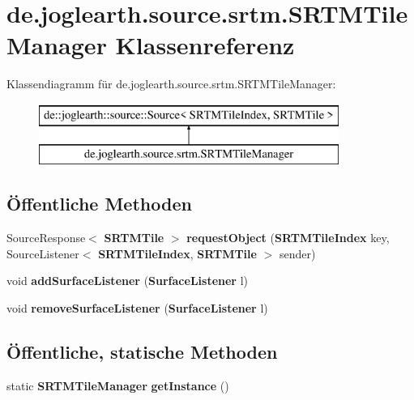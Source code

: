 \section{de.\-joglearth.\-source.\-srtm.\-S\-R\-T\-M\-Tile\-Manager Klassenreferenz}
\label{classde_1_1joglearth_1_1source_1_1srtm_1_1_s_r_t_m_tile_manager}
Klassendiagramm für de.\-joglearth.\-source.\-srtm.\-S\-R\-T\-M\-Tile\-Manager\-:\begin{figure}[H]
\begin{center}
\leavevmode
\includegraphics[height=2.000000cm]{classde_1_1joglearth_1_1source_1_1srtm_1_1_s_r_t_m_tile_manager}
\end{center}
\end{figure}
\subsection*{Öffentliche Methoden}
\begin{DoxyCompactItemize}
\item 
Source\-Response$<$ {\bf S\-R\-T\-M\-Tile} $>$ {\bfseries request\-Object} ({\bf S\-R\-T\-M\-Tile\-Index} key, Source\-Listener$<$ {\bf S\-R\-T\-M\-Tile\-Index}, {\bf S\-R\-T\-M\-Tile} $>$ sender)\label{classde_1_1joglearth_1_1source_1_1srtm_1_1_s_r_t_m_tile_manager_a550623a000605af3dc7527d07bc74a74}

\item 
void {\bfseries add\-Surface\-Listener} ({\bf Surface\-Listener} l)\label{classde_1_1joglearth_1_1source_1_1srtm_1_1_s_r_t_m_tile_manager_a89be1c30bb09cd331cb178832cbb65b3}

\item 
void {\bfseries remove\-Surface\-Listener} ({\bf Surface\-Listener} l)\label{classde_1_1joglearth_1_1source_1_1srtm_1_1_s_r_t_m_tile_manager_a669c41f02243b7fe3fba9e8176488b67}

\end{DoxyCompactItemize}
\subsection*{Öffentliche, statische Methoden}
\begin{DoxyCompactItemize}
\item 
static {\bf S\-R\-T\-M\-Tile\-Manager} {\bfseries get\-Instance} ()\label{classde_1_1joglearth_1_1source_1_1srtm_1_1_s_r_t_m_tile_manager_a35779b3791c0b99d85cbf28e7f9a3edd}

\end{DoxyCompactItemize}
